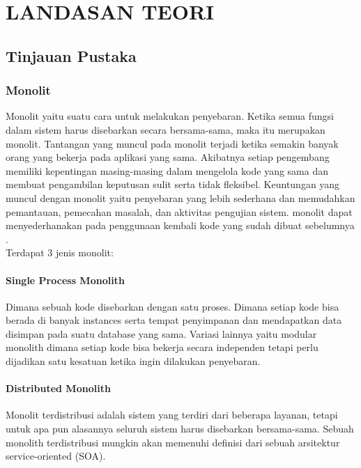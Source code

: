 \chapter{LANDASAN TEORI}
\vspace{4.5pt}

\section{Tinjauan Pustaka}

\subsection{Monolit}
Monolit yaitu suatu cara untuk melakukan penyebaran. Ketika semua fungsi dalam sistem harus disebarkan secara bersama-sama, maka itu merupakan monolit. Tantangan yang muncul pada monolit terjadi ketika semakin banyak orang yang bekerja pada aplikasi yang sama. Akibatnya setiap pengembang memiliki kepentingan masing-masing dalam mengelola kode yang sama dan membuat pengambilan keputusan sulit serta tidak fleksibel. Keuntungan yang muncul dengan monolit yaitu penyebaran yang lebih sederhana dan memudahkan pemantauan, pemecahan masalah, dan aktivitas pengujian sistem. monolit dapat menyederhanakan pada penggunaan kembali kode yang sudah dibuat sebelumnya \cite{6}.\\

Terdapat 3 jenis monolit:
\subsubsection{Single Process Monolith}
Dimana sebuah kode disebarkan dengan satu proses. Dimana setiap kode bisa berada di banyak instances serta tempat penyimpanan dan mendapatkan data disimpan pada suatu database yang sama. Variasi lainnya yaitu modular monolith dimana setiap kode bisa bekerja secara independen tetapi perlu dijadikan satu kesatuan ketika ingin dilakukan penyebaran\cite{6}. \\
\subsubsection{Distributed Monolith}
Monolit terdistribusi adalah sistem yang terdiri dari beberapa layanan, tetapi untuk apa pun alasannya seluruh sistem harus disebarkan bersama-sama. Sebuah monolith terdistribusi mungkin akan memenuhi definisi dari sebuah arsitektur service-oriented (SOA)\cite{6}.\\

